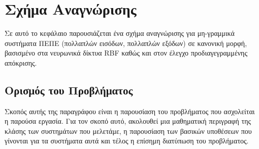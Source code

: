 \chapter{Σχήμα Αναγνώρισης}
\label{chap:scheme_presentation}
Σε αυτό το κεφάλαιο παρουσιάζεται ένα σχήμα αναγνώρισης για μη-γραμμικά συστήματα ΠΕΠΕ (πολλαπλών εισόδων, πολλαπλών εξόδων) σε κανονική μορφή, βασισμένο στα νευρωνικά δίκτυα RBF καθώς και στον έλεγχο προδιαγεγραμμένης απόκρισης.


\section{Ορισμός του Προβλήματος}
Σκοπός αυτής της παραγράφου είναι η παρουσίαση του προβλήματος που ασχολείται η παρούσα εργασία. Για τον σκοπό αυτό, ακολουθεί μια μαθηματική περιγραφή της κλάσης των συστημάτων που μελετάμε, η παρουσίαση των βασικών υποθέσεων που γίνονται για τα συστήματα αυτά και τέλος η επίσημη διατύπωση του προβλήματος.
